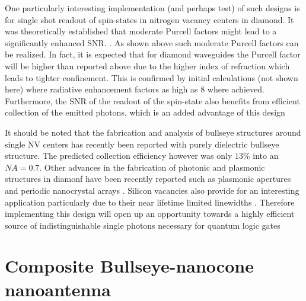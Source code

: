 \documentclass[10pt,onecolumn ]{article}
\begin{document}
One particularly interesting implementation (and perhaps test) of such designs is for single shot readout of spin-states in nitrogen vacancy centers in diamond. It was theoretically established that moderate Purcell factors might lead to a significantly enhanced SNR. \cite{Wolf2015Purcell-enhancedDiamond}. 
As shown above such moderate Purcell factors can be realized. In fact, it is expected  that for diamond waveguides the Purcell factor will be higher than reported above due to the higher index of refraction which leads to tighter confinement. 
This is confirmed by initial calculations (not shown here) where radiative enhancement factors as high as 8 where achieved. 
Furthermore, the SNR of the readout of the spin-state also benefits from efficient collection of the emitted photons, which is an added advantage of this design 


It should be noted that the fabrication and analysis of bullseye structures around single NV centers has recently been reported with purely dielectric bullseye structure. \cite{Li2015EfficientGrating} The predicted collection efficiency however was only $13\%$ into an $NA=0.7$.
Other advances in the fabrication of photonic and plasmonic structures in diamonf have been recently reported such as plasmonic apertures  \cite{Choy2011EnhancedAperture} and periodic nanocrystal arrays \cite{Aharonovich2013Bottom-upNano-structures}. 
Silicon vacancies also provide for an interesting application particularly due to their near lifetime limited linewidths \cite{Sipahigil2014IndistinguishableDiamond,Li2016NonblinkingNanodiamonds}. Therefore implementing this design will open up an opportunity towards a highly efficient source of indistinguishable single photons necessary for quantum logic gates \cite{Aharonovich2016Solid-stateEmitters} 

\section{Composite Bullseye-nanocone nanoantenna}
\end{document}
